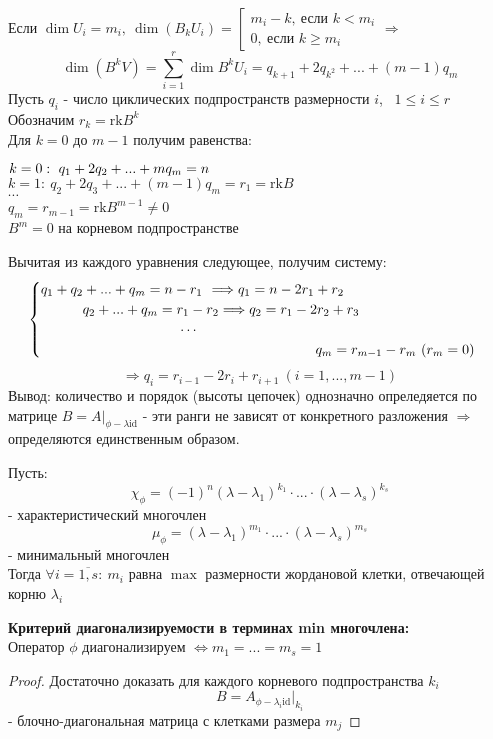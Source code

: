     Если $\dim U_i = m_i, \ \dim (B_kU_i) = \left[\begin{matrix}
        m_i - k, \ \text{если } k<m_i\\
        0, \ \text{если } k\geq m_i
    \end{matrix} \right. \Longrightarrow$
    $$\dim (B^kV) = \sum \limits_{i=1}^r \dim B^kU_i = q_{k+1}+2q_{k^2} + ... + (m-1)q_m$$ 
    Пусть $q_i$ - число циклических подпространств размерности $i$, \ $1\leq i \leq r$\\
    Обозначим $r_k = \text{rk}B^k$\\
    Для $k = 0$ до $m-1$ получим равенства: 
    \begin{center}
        $k=0: \ q_1 + 2q_2 + ... + mq_m = n\tab[2.9cm]$\\
        $k=1: \ q_2 + 2q_3 + ... + (m-1)q_m = r_1 = \text{rk}B$\\
        $\cdots$\\
        $q_m = r_{m-1} = \text{rk}B^{m-1} \neq 0$ \\
        $B^m = 0$ на корневом подпространстве     
    \end{center}
    Вычитая из каждого уравнения следующее, получим систему:
    $$\begin{cases}
        q_1 + q_2 + ... + q_m = n - r_1 \tab[0.13cm] \Longrightarrow q_1 = n - 2r_1 + r_2 \\
        \tab[1.05cm] q_2 + ... + q_m = r_1 - r_2 \Longrightarrow q_2 = r_1 - 2r_2 + r_3\\
        \tab[3.5cm]\cdots\\
        \tab[6.9cm]q_m = r_{m-1} - r_m \ (r_m = 0)
    \end{cases}$$
    $$\Longrightarrow q_i = r_{i-1} - 2r_i + r_{i+1} \ (i = 1,...,m-1)$$
    Вывод: количество и порядок (высоты цепочек) однозначно опреледяется по матрице $B=A|_{\phi-\lambda \text{id}}$ - эти ранги не зависят от конкретного разложения $\Longrightarrow$ определяются единственным образом.
    \begin{consequense}
        Пусть: 
        $$\chi_\phi = (-1)^n(\lambda-\lambda_1)^{k_1}\cdot ... \cdot (\lambda-\lambda_s)^{k_s}$$
        - характеристический многочлен
        $$\mu_\phi = (\lambda-\lambda_1)^{m_1}\cdot ... \cdot (\lambda-\lambda_s)^{m_s}$$
        - минимальный многочлен\\
        Тогда $\forall i = \overline{1,s}: \ m_i$ равна $\max$ размерности жордановой клетки, отвечающей корню $\lambda_i$   
    \end{consequense}
    \begin{consequense}\textbf{ Критерий диагонализируемости в терминах min многочлена:} \\
        Оператор $\phi$ диагонализируем $\Longleftrightarrow m_1 = ... =m_s=1$  
    \end{consequense}
    \begin{proof}
        Достаточно доказать для каждого корневого подпространства $k_i$
        $$B = A_{\phi-\lambda_i \text{id}}|_{k_i}$$
        - блочно-диагональная матрица с клетками размера $m_j$   
    \end{proof} 

